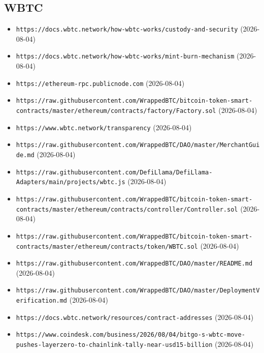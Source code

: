 \subsection*{WBTC}
\begin{itemize}\setlength{\itemsep}{0pt}\small
\item \texttt{https://docs.wbtc.network/how-wbtc-works/custody-and-security} (2026-08-04)
\item \texttt{https://docs.wbtc.network/how-wbtc-works/mint-burn-mechanism} (2026-08-04)
\item \texttt{https://ethereum-rpc.publicnode.com} (2026-08-04)
\item \texttt{https://raw.githubusercontent.com/WrappedBTC/bitcoin-token-smart-contracts/master/ethereum/contracts/factory/Factory.sol} (2026-08-04)
\item \texttt{https://www.wbtc.network/transparency} (2026-08-04)
\item \texttt{https://raw.githubusercontent.com/WrappedBTC/DAO/master/MerchantGuide.md} (2026-08-04)
\item \texttt{https://raw.githubusercontent.com/DefiLlama/DefiLlama-Adapters/main/projects/wbtc.js} (2026-08-04)
\item \texttt{https://raw.githubusercontent.com/WrappedBTC/bitcoin-token-smart-contracts/master/ethereum/contracts/controller/Controller.sol} (2026-08-04)
\item \texttt{https://raw.githubusercontent.com/WrappedBTC/bitcoin-token-smart-contracts/master/ethereum/contracts/token/WBTC.sol} (2026-08-04)
\item \texttt{https://raw.githubusercontent.com/WrappedBTC/DAO/master/README.md} (2026-08-04)
\item \texttt{https://raw.githubusercontent.com/WrappedBTC/DAO/master/DeploymentVerification.md} (2026-08-04)
\item \texttt{https://docs.wbtc.network/resources/contract-addresses} (2026-08-04)
\item \texttt{https://www.coindesk.com/business/2026/08/04/bitgo-s-wbtc-move-pushes-layerzero-to-chainlink-tally-near-usd15-billion} (2026-08-04)
\end{itemize}

